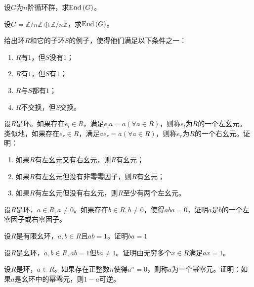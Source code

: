 \begin{prob}
设$G$为$n$阶循环群，求${\rm End}\left(G\right)$。
\end{prob}

\begin{prob}
设$G=\mathbb{Z}/n\mathbb{Z}\oplus \mathbb{Z}/n\mathbb{Z}$，求${\rm End}\left(G\right)$。
\end{prob}

\begin{prob}
给出环$R$和它的子环$S$的例子，使得他们满足以下条件之一：
\begin{enumerate}[$(1)$]
\item $R$有$1$，但$S$没有$1$；
\item $R$有$1$，但$S$有$1$；
\item $R$与$S$都有$1$；
\item $R$不交换，但$S$交换。
\end{enumerate}
\end{prob}

\begin{prob}
设$R$是环。如果存在$e_{l}\in R$，满足$e_{l}a=a\left(\forall a\in R\right)$，则称$e_{l}$为$R$的一个{\heiti 左幺元}。类似地，如果存在$e_{r}\in R$，满足$ae_{r}=a\left(\forall a\in R\right)$，则称$e_{r}$为$R$的一个{\heiti 右幺元}。证明：
\begin{enumerate}[$(1)$]
\item 如果$R$有左幺元又有右幺元，则$R$有幺元；
\item 如果$R$有左幺元但没有非零零因子，则$R$有幺元；
\item 如果$R$有左幺元但没有右幺元，则$R$至少有两个左幺元。
\end{enumerate}
\end{prob}

\begin{prob}
设$R$是环，$a\in R,a\neq 0$。如果存在$b\in R,b\neq 0$，使得$aba=0$，证明$a$是$b$的一个左零因子或右零因子。
\end{prob}

\begin{prob}
设$R$是有限幺环，$a,b\in R$且$ab=1$。证明$ba=1$
\end{prob}

\begin{probx}
设$R$是幺环，$a,b\in R,ab=1$但$ba\neq 1$。证明由无穷多个$x\in R$满足$ax=1$。
\end{probx}

\begin{prob}
设$R$是环，$a\in R$。如果存在正整数$n$使得$a^{n}=0$，则称$a$为一个{\heiti 幂零元}。证明：如果$a$是幺环中的幂零元，则$1-a$可逆。
\end{prob}

